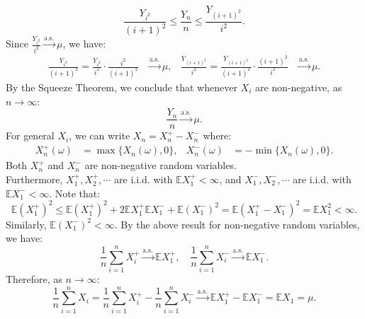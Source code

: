 \documentclass{huhtakm-template-book-v2}
\newcommand{\expect}{\mathbb{E}}
\begin{document}
\begin{proofing}
\begin{equation*}
            \frac{Y_{i^{2}}}{(i+1)^{2}} \leq \frac{Y_{n}}{n} \leq \frac{Y_{(i+1)^{2}}}{i^{2}}.
        \end{equation*}
        Since $\frac{Y_{i^{2}}}{i^{2}} \xrightarrow{\text{a.s.}} \mu$, we have:
        \begin{align*}
            \frac{Y_{i^{2}}}{(i+1)^{2}} = \frac{Y_{i^{2}}}{i^{2}}\cdot\frac{i^{2}}{(i+1)^{2}} &\xrightarrow{\text{a.s.}} \mu, & \frac{Y_{(i+1)^{2}}}{i^{2}} = \frac{Y_{(i+1)^{2}}}{(i+1)^{2}}\cdot\frac{(i+1)^{2}}{i^{2}} &\xrightarrow{\text{a.s.}} \mu.
        \end{align*}
        By the Squeeze Theorem, we conclude that whenever $X_{i}$ are non-negative, as $n \to \infty$:
        \begin{equation*}
            \frac{Y_{n}}{n} \xrightarrow{\text{a.s.}} \mu.
        \end{equation*}
        For general $X_{i}$, we can write $X_{n} = X_{n}^{+}-X_{n}^{-}$ where:
        \begin{align*}
            X_{n}^{+}(\omega) &= \max\{X_{n}(\omega),0\}, & X_{n}^{-}(\omega) &= -\min\{X_{n}(\omega),0\}.
        \end{align*}
        Both $X_{n}^{+}$ and $X_{n}^{-}$ are non-negative random variables.\\
        Furthermore, $X_{1}^{+},X_{2}^{+},\cdots$ are i.i.d. with $\expect{X_{1}^{+}} < \infty$, and $X_{1}^{-},X_{2}^{-},\cdots$ are i.i.d. with $\expect{X_{1}^{-}} < \infty$. Note that:
        \begin{equation*}
            \expect(X_{1}^{+})^{2} \leq \expect(X_{1}^{+})^{2}+2\expect{X_{1}^{+}}\expect{X_{1}^{-}}+\expect(X_{1}^{-})^{2} = \expect(X_{1}^{+}-X_{1}^{-})^{2} = \expect{X_{1}^{2}} < \infty.
        \end{equation*}
        Similarly, $\expect(X_{1}^{-})^{2} < \infty$. By the above result for non-negative random variables, we have:
        \begin{equation*}
            \frac{1}{n}\sum_{i = 1}^{n}X_{i}^{+} \xrightarrow{\text{a.s.}} \expect{X_{1}^{+}},\quad \frac{1}{n}\sum_{i = 1}^{n}X_{i}^{-} \xrightarrow{\text{a.s.}} \expect{X_{1}^{-}}.
        \end{equation*}
        Therefore, as $n \to \infty$:
        \begin{equation*}
            \frac{1}{n}\sum_{i = 1}^{n}X_{i} = \frac{1}{n}\sum_{i = 1}^{n}X_{i}^{+}-\frac{1}{n}\sum_{i = 1}^{n}X_{i}^{-} \xrightarrow{\text{a.s.}} \expect{X_{1}^{+}}-\expect{X_{1}^{-}} = \expect{X_{1}} = \mu.
        \end{equation*}
    \end{proofing}
    \newpage
\end{document}
